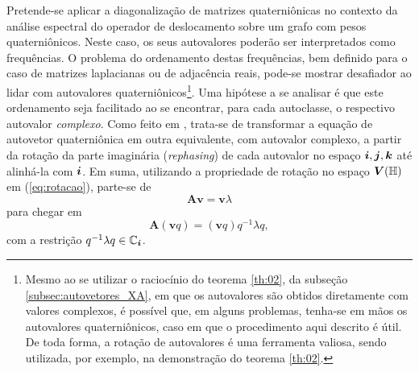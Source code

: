 Pretende-se aplicar a diagonaliza\c c\~ao de matrizes quaterni\^onicas no contexto da an\'alise espectral do operador de deslocamento sobre um grafo com pesos quaterni\^onicos. Neste caso, os seus autovalores poder\~ao ser interpretados como frequ\^encias. O problema do ordenamento destas frequ\^encias, bem definido para o caso de matrizes laplacianas ou de adjac\^encia reais, pode-se mostrar desafiador ao lidar com autovalores quaterni\^onicos\footnote{Mesmo ao se utilizar o racioc\'inio do teorema \ref{th:02}, da subse\c c\~ao \ref{subsec:autovetores_XA}, em que os autovalores s\~ao obtidos diretamente com valores complexos, \'e poss\'ivel que, em alguns problemas, tenha-se em m\~aos os autovalores quaterni\^onicos, caso em que o procedimento aqui descrito \'e \'util. De toda forma, a rota\c c\~ao de autovalores \'e uma ferramenta valiosa, sendo utilizada, por exemplo, na demonstra\c c\~ao do teorema \ref{th:02}.}.
Uma hip\'otese a se analisar \'e que este ordenamento seja facilitado ao se encontrar, para cada autoclasse, o respectivo autovalor \emph{complexo}. Como feito em \cite[Eq. (4.8)]{de2002quaternioic}, trata-se de transformar a equa\c c\~ao de autovetor quaterni\^onica em outra equivalente, com autovalor complexo, a partir da rota\c c\~ao da parte imagin\'aria (\emph{rephasing}) de cada autovalor no espa\c co $ \boldsymbol{i}, \boldsymbol{j}, \boldsymbol{k} $ at\'e alinh\'a-la com $ \boldsymbol{i} $. Em suma, utilizando a propriedade de rota\c c\~ao no espa\c co $ \boldsymbol{V} (\mathbb{H}) $ em (\ref{eq:rotacao}), parte-se de
\begin{equation}
\label{eq:01}
\mathbf{A} \mathbf{v} = \mathbf{v} \lambda
\end{equation}
para chegar em
\begin{equation}
\label{eq:02}
\mathbf{A} (\mathbf{v} q) = (\mathbf{v} q) q^{-1} \lambda q,
\end{equation}
com a restri\c c\~ao $ q^{-1} \lambda q \in \mathbb{C}_{\boldsymbol{i}} $.

